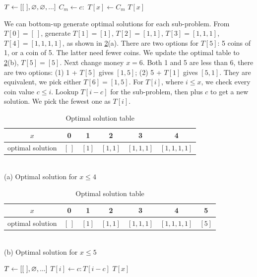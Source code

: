 \documentclass[b5paper]{article}
\begin{document}
\begin{algorithmic}[1]
\State $T \gets [[\ ], \varnothing, \varnothing, ...]$ 
      \State $C_m \gets c :$ 
        \State $T[x] \gets C_m$
      \EndIf
    \EndFor
  \EndIf
  \State \Return $T[x]$
\EndFunction
\end{algorithmic}

We can bottom-up generate optimal solutions for each sub-problem. From $T[0] = [\ ]$, generate $T[1] = [1]$, $T[2] = [1, 1]$, $T[3] = [1, 1, 1]$, $T[4] = [1, 1, 1, 1]$, as shown in \cref{tab:change-money}(a). There are two options for $T[5]$: 5 coins of 1, or a coin of 5. The latter need fewer coins. We update the optimal table to \cref{tab:change-money}(b), $T[5] = [5]$. Next change money $x = 6$. Both 1 and 5 are less than 6, there are two options: (1) 1 + $T[5]$ gives $[1, 5]$; (2) 5 + $T[1]$ gives $[5, 1]$. They are equivalent, we pick either $T[6] = [1, 5]$. For $T[i]$, where $i \leq x$, we check every coin value $c \leq i$. Lookup $T[i - c]$ for the sub-problem, then plus $c$ to get a new solution. We pick the fewest one as $T[i]$.

\begin{table}[htbp]
\centering
\begin{tabular}{|c||c|c|c|c|c|}
\hline
$x$ & 0 & 1 & 2 & 3 & 4 \\
\hline
optimal solution & $[\ ]$ & $[1]$ & $[1, 1]$ & $[1, 1, 1]$ & $[1, 1, 1, 1]$ \\
\hline
\end{tabular} \\
(a) Optimal solution for $x \leq 4$ \\
\vspace{10pt}
\begin{tabular}{c||c|c|c|c|c|c|}
\hline
$x$ & 0 & 1 & 2 & 3 & 4 & 5 \\
\hline
optimal solution & $[\ ]$ & $[1]$ & $[1, 1]$ & $[1, 1, 1]$ & $[1, 1, 1, 1]$ & $[5]$ \\
\hline
\end{tabular} \\
(b) Optimal solution for $x \leq 5$ \\
\caption{Optimal solution table}
\label{tab:change-money}
\end{table}

\begin{algorithmic}[1]
  \State $T \gets [[\ ], \varnothing, ... ]$
        \State $T[i] \gets  c : T[i-c]$
      \EndIf
    \EndFor
  \EndFor
  \State \Return $T[x]$
\EndFunction
\end{algorithmic}
\end{document}
